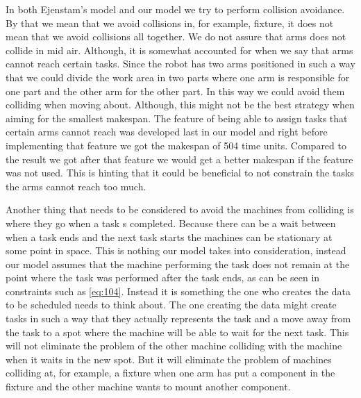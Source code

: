 In both Ejenstam's model and our model we try to perform collision avoidance. By that we mean that we avoid collisions in, for example, fixture, it does not mean that we avoid collisions all together. We do not assure that arms does not collide in mid air. Although, it is somewhat accounted for when we say that arms cannot reach certain tasks. Since the robot has two arms positioned in such a way that we could divide the work area in two parts where one arm is responsible for one part and the other arm for the other part. In this way we could avoid them colliding when moving about. Although, this might not be the best strategy when aiming for the smallest makespan. The feature of being able to assign tasks that certain arms cannot reach was developed last in our model and right before implementing that feature we got the makespan of 504 time units. Compared to the result we got after that feature we would get a better makespan if the feature was not used. This is hinting that it could be beneficial to not constrain the tasks the arms cannot reach too much.

Another thing that needs to be considered to avoid the machines from colliding is where they go when a task s completed. Because there can be a wait between when a task ends and the next task starts the machines can be stationary at some point in space. This is nothing our model takes into consideration, instead our model assumes that the machine performing the task does not remain at the point where the task was performed after the task ends, as can be seen in constraints such as \ref{eq:104}. Instead it is something the one who creates the data to be scheduled needs to think about. The one creating the data might create tasks in such a way that they actually represents the task and a move away from the task to a spot where the machine will be able to wait for the next task. This will not eliminate the problem of the other machine colliding with the machine when it waits in the new spot. But it will eliminate the problem of machines colliding at, for example, a fixture when one arm has put a component in the fixture and the other machine wants to mount another component.

